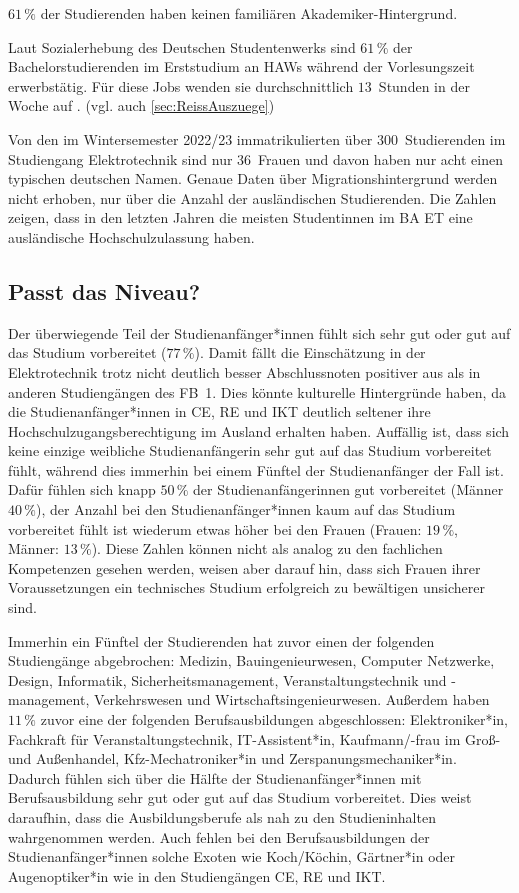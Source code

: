 \documentclass[a4paper, 12 pt]{IEEEtran}
\begin{document}
$61\,\%$ der Studierenden haben keinen familiären Akademiker-Hintergrund. 

Laut Sozialerhebung des Deutschen Studentenwerks sind $61\,\%$ der Bachelorstudierenden im Erststudium an HAWs während der Vorlesungszeit erwerbstätig. Für diese Jobs wenden sie durchschnittlich $13$~Stunden in der Woche auf \cite{Middendorf.2013}. (vgl. auch \ref{sec:ReissAuszuege})

Von den im Wintersemester 2022/23 immatrikulierten über $300$~Studierenden im Studiengang Elektrotechnik sind nur $36$~Frauen und davon haben nur acht einen typischen deutschen Namen. Genaue Daten über Migrationshintergrund werden nicht erhoben, nur über die Anzahl der ausländischen Studierenden. Die Zahlen zeigen, dass in den letzten Jahren die meisten Studentinnen im BA ET eine ausländische Hochschulzulassung haben.

\subsection{Passt das Niveau?}
Der überwiegende Teil der Studienanfänger*innen fühlt sich sehr gut oder gut auf das Studium vorbereitet ($77\,\%$). Damit fällt die Einschätzung in der Elektrotechnik trotz nicht deutlich besser Abschlussnoten positiver aus als in anderen Studiengängen des FB~1. Dies könnte kulturelle Hintergründe haben, da die Studienanfänger*innen in CE, RE und IKT deutlich seltener ihre Hochschulzugangsberechtigung im Ausland erhalten haben.
Auffällig ist, dass sich keine einzige weibliche Studienanfängerin sehr gut auf das Studium vorbereitet fühlt, während dies immerhin bei einem Fünftel der Studienanfänger der Fall ist. Dafür fühlen sich knapp $50\,\%$ der Studienanfängerinnen gut vorbereitet (Männer $40\,\%$), der Anzahl bei den Studienanfänger*innen kaum auf das Studium vorbereitet fühlt ist wiederum etwas höher bei den Frauen (Frauen: $19\,\%$, Männer: $13\,\%$). Diese Zahlen können nicht als analog zu den fachlichen Kompetenzen gesehen werden, weisen aber darauf hin, dass sich Frauen ihrer Voraussetzungen ein technisches Studium erfolgreich zu bewältigen unsicherer sind.

Immerhin ein Fünftel der Studierenden hat zuvor einen der folgenden Studiengänge abgebrochen: Medizin, Bauingenieurwesen, Computer Netzwerke, Design, Informatik, Sicherheitsmanagement, Ver\-an\-stal\-tungs\-technik und -management, Verkehrswesen und Wirtschaftsingenieurwesen. Außerdem haben $11\,\%$ zuvor eine der folgenden Berufsausbildungen abgeschlossen: Elektroniker*in, Fachkraft für Veranstaltungstechnik, IT-Assistent*in, Kaufmann/-frau im Groß- und Außenhandel, Kfz-Mechatroniker*in und Zerspanungsmechaniker*in. Dadurch fühlen sich über die Hälfte der Studienanfänger*innen mit Berufsausbildung sehr gut oder gut auf das Studium vorbereitet. Dies weist daraufhin, dass die Ausbildungsberufe als nah zu den Studieninhalten wahrgenommen werden. Auch fehlen bei den Berufsausbildungen der Studienanfänger*innen solche Exoten wie Koch/Köchin, Gärtner*in oder Augenoptiker*in wie in den Studiengängen CE, RE und IKT. 
\end{document}

